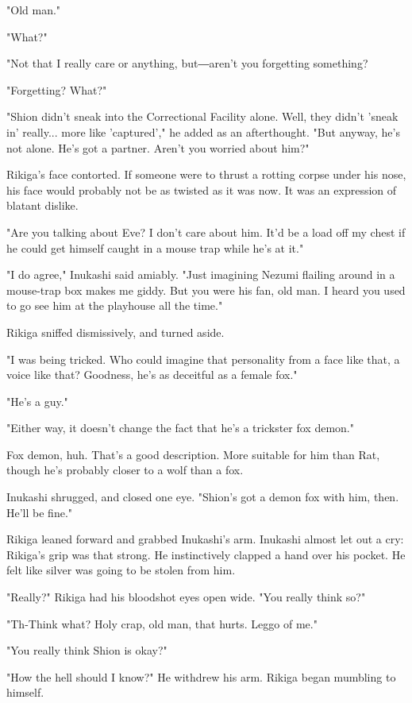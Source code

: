 "Old man."

"What?"

"Not that I really care or anything, but―aren't you forgetting
something?

"Forgetting? What?"

"Shion didn't sneak into the Correctional Facility alone. Well, they
didn't 'sneak in' really... more like 'captured'," he added as an
afterthought. "But anyway, he's not alone. He's got a partner. Aren't
you worried about him?"

Rikiga's face contorted. If someone were to thrust a rotting corpse
under his nose, his face would probably not be as twisted as it was now.
It was an expression of blatant dislike.

"Are you talking about Eve? I don't care about him. It'd be a load off
my chest if he could get himself caught in a mouse trap while he's at
it."

"I do agree," Inukashi said amiably. "Just imagining Nezumi flailing
around in a mouse-trap box makes me giddy. But you were his fan, old
man. I heard you used to go see him at the playhouse all the time."

Rikiga sniffed dismissively, and turned aside.

"I was being tricked. Who could imagine that personality from a face
like that, a voice like that? Goodness, he's as deceitful as a female
fox."

"He's a guy."

"Either way, it doesn't change the fact that he's a trickster fox
demon."

Fox demon, huh. That's a good description. More suitable for him than
Rat, though he's probably closer to a wolf than a fox.

Inukashi shrugged, and closed one eye. "Shion's got a demon fox with
him, then. He'll be fine."

Rikiga leaned forward and grabbed Inukashi's arm. Inukashi almost let
out a cry: Rikiga's grip was that strong. He instinctively clapped a
hand over his pocket. He felt like silver was going to be stolen from
him.

"Really?" Rikiga had his bloodshot eyes open wide. "You really think
so?"

"Th-Think what? Holy crap, old man, that hurts. Leggo of me."

"You really think Shion is okay?"

"How the hell should I know?" He withdrew his arm. Rikiga began mumbling
to himself.

